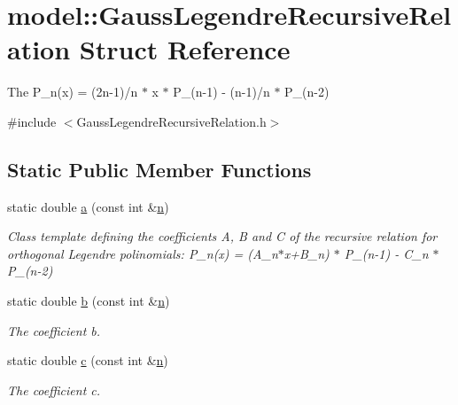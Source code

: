 \hypertarget{structmodel_1_1_gauss_legendre_recursive_relation}{}\section{model\+:\+:Gauss\+Legendre\+Recursive\+Relation Struct Reference}
\label{structmodel_1_1_gauss_legendre_recursive_relation}


The P\+\_\+n(x) = (2n-\/1)/n $\ast$ x $\ast$ P\+\_\+(n-\/1) -\/ (n-\/1)/n $\ast$ P\+\_\+(n-\/2)  




{\ttfamily \#include $<$Gauss\+Legendre\+Recursive\+Relation.\+h$>$}

\subsection*{Static Public Member Functions}
\begin{DoxyCompactItemize}
\item 
static double \hyperlink{structmodel_1_1_gauss_legendre_recursive_relation_a041c35cd3a63301bb65167b31900d1df}{a} (const int \&\hyperlink{_f_e_m_2linear__elasticity__3d_2tetgen_2generate_p_o_l_ycube_8m_a74637fc31d6aedd6d61cdc0c8154bc13}{n})
\begin{DoxyCompactList}\small\item\em Class template defining the coefficients A, B and C of the recursive relation for orthogonal Legendre polinomials\+: P\+\_\+n(x) = (A\+\_\+n$\ast$x+\+B\+\_\+n) $\ast$ P\+\_\+(n-\/1) -\/ C\+\_\+n $\ast$ P\+\_\+(n-\/2) \end{DoxyCompactList}\item 
static double \hyperlink{structmodel_1_1_gauss_legendre_recursive_relation_ac98e979985f013ef9b6df78e3778381b}{b} (const int \&\hyperlink{_f_e_m_2linear__elasticity__3d_2tetgen_2generate_p_o_l_ycube_8m_a74637fc31d6aedd6d61cdc0c8154bc13}{n})
\begin{DoxyCompactList}\small\item\em The coefficient b. \end{DoxyCompactList}\item 
static double \hyperlink{structmodel_1_1_gauss_legendre_recursive_relation_af98290562b27be7bdc2225d6b69846d4}{c} (const int \&\hyperlink{_f_e_m_2linear__elasticity__3d_2tetgen_2generate_p_o_l_ycube_8m_a74637fc31d6aedd6d61cdc0c8154bc13}{n})
\begin{DoxyCompactList}\small\item\em The coefficient c. \end{DoxyCompactList}\end{DoxyCompactItemize}


